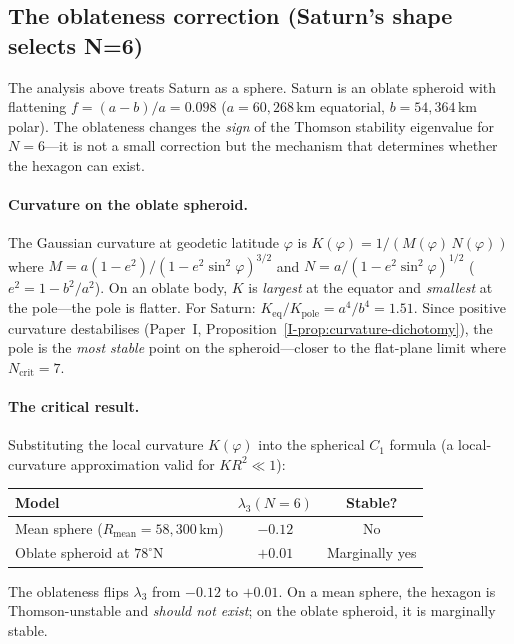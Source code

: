 \subsection{The oblateness correction (Saturn's shape selects N=6)}
\label{sec:oblateness}

The analysis above treats Saturn as a sphere.  Saturn is an oblate
spheroid with flattening $f = (a{-}b)/a = 0.098$
($a = 60{,}268$\,km equatorial, $b = 54{,}364$\,km polar).
The oblateness changes the \emph{sign} of the Thomson stability
eigenvalue for $N = 6$---it is not a small correction but the
mechanism that determines whether the hexagon can exist.

\paragraph{Curvature on the oblate spheroid.}
The Gaussian curvature at geodetic latitude $\varphi$ is
$K(\varphi) = 1/(M(\varphi)\,N(\varphi))$ where
$M = a(1{-}e^2)/(1{-}e^2\sin^2\!\varphi)^{3/2}$ and
$N = a/(1{-}e^2\sin^2\!\varphi)^{1/2}$
($e^2 = 1 - b^2/a^2$).
On an oblate body, $K$ is \emph{largest} at the equator and
\emph{smallest} at the pole---the pole is flatter.
For Saturn: $K_{\mathrm{eq}}/K_{\mathrm{pole}} = a^4/b^4 = 1.51$.
Since positive curvature destabilises (Paper~I,
Proposition~\ref{I-prop:curvature-dichotomy}), the pole is
the \emph{most stable} point on the spheroid---closer to the
flat-plane limit where $N_{\mathrm{crit}} = 7$.

\paragraph{The critical result.}
Substituting the local curvature $K(\varphi)$ into the spherical
$C_1$ formula (a local-curvature approximation valid for
$K R^2 \ll 1$):
\begin{center}
\begin{tabular}{lcc}
\toprule
Model & $\lambda_3(N{=}6)$ & Stable? \\
\midrule
Mean sphere ($R_{\mathrm{mean}} = 58{,}300$\,km) &
  $-0.12$ & No \\
Oblate spheroid at $78^\circ$N &
  $+0.01$ & Marginally yes \\
\bottomrule
\end{tabular}
\end{center}
The oblateness flips $\lambda_3$ from $-0.12$ to $+0.01$.
On a mean sphere, the hexagon is Thomson-unstable and
\emph{should not exist}; on the oblate spheroid, it is
marginally stable.

